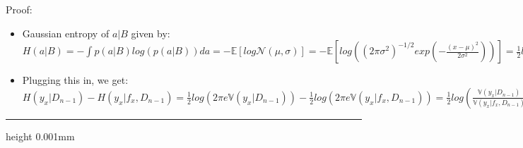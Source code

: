 \begin{itemize}
    Proof:
    \begin{itemize}
        \item Gaussian entropy of $a|B$ given by: $H(a|B) = - \int p(a|B) log(p(a|B)) da = - \mathbb{E} [ log \mathcal{N}(\mu, \sigma) ] = - \mathbb{E} [ log ((2 \pi \sigma^2)^{-1/2} exp ( - \frac{ (x-\mu)^2 }{ 2 \sigma^2 } )) ] = \frac{1}{2} log (2 \pi \sigma^2) + \frac{1}{2\sigma^2} \mathbb{E}[ (x-\mu)^2 ] = \frac{1}{2} log(2 \pi \sigma^2) + \frac{1}{2} \times 1 = \frac{1}{2} log(2 \pi \sigma^2) + \frac{1}{2} log(e) = \frac{1}{2} log(2 \pi e \sigma^2) $
        \item Plugging this in, we get: $H(y_x | D_{n-1}) - H(y_x | f_x, D_{n-1}) = \frac{1}{2} log(2 \pi e  \mathbb{V}(y_x | D_{n-1})) - \frac{1}{2} log(2 \pi e \mathbb{V}(y_x | f_x, D_{n-1})) = \frac{1}{2} log( \frac{\mathbb{V}(y_x | D_{n-1})}{\mathbb{V}(y_x | f_x, D_{n-1})} )$ 
    \end{itemize}
\end{itemize}

{\color{lightgray}\hrule height 0.001mm}

